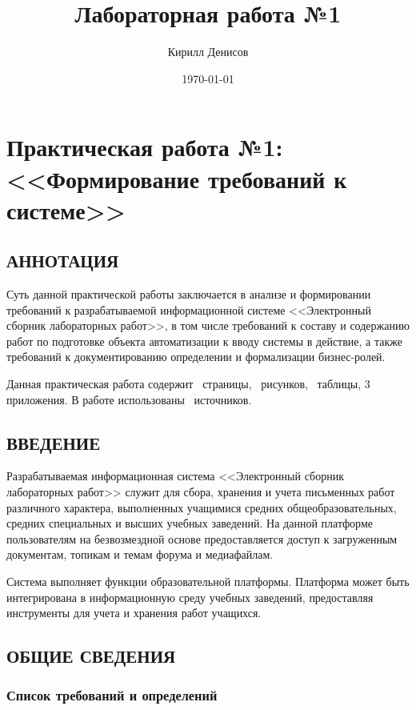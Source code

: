 \documentclass[a4paper,14pt]{extarticle}
\author{Кирилл Денисов}
\title{Лабораторная работа №1}
\date{\today}
\newcommand{\pathToCommonFolder}{/home/denilai/Documents/repos/latex/Common}
\begin{document}
	\thispagestyle{empty}
	
	\newpage
	\tableofcontents
	\newpage
	
\normalsize

\section{Практическая работа №1: <<Формирование требований к системе>>}
\subsection{АННОТАЦИЯ}
Суть данной практической работы заключается в анализе и формировании требований к разрабатываемой информационной системе <<Электронный сборник лабораторных работ>>, в том числе требований к составу и содержанию работ по подготовке объекта автоматизации к вводу системы в действие, а также требований к документированию определении и формализации бизнес-ролей.

Данная практическая работа содержит \pageref*{LastPage}~страницы, \totfig~рисунков, \tottab~таблицы, 3 приложения. В работе использованы \totref~источников.

\newpage
\subsection{ВВЕДЕНИЕ}

Разрабатываемая информационная система <<Электронный сборник лабораторных работ>> служит для сбора, хранения и учета письменных работ различного характера, выполненных учащимися средних общеобразовательных, средних специальных и высших учебных заведений. На данной платформе пользователям на безвозмездной основе предоставляется доступ к загруженным документам, топикам и темам форума и медиафайлам. 

Система выполняет функции образовательной платформы. Платформа может быть интегрирована в информационную среду учебных заведений, предоставляя инструменты для учета и хранения работ учащихся. 


\subsection{ОБЩИЕ СВЕДЕНИЯ}
\subsubsection{Список требований и определений}
\end{document}
